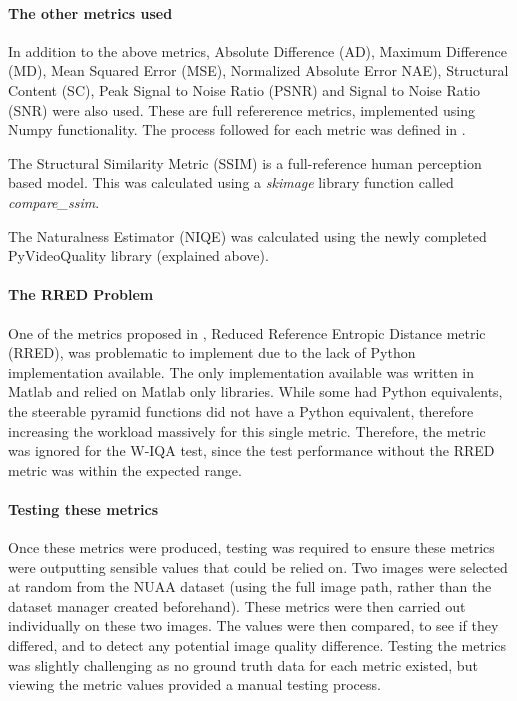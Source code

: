\documentclass[12pt,a4paper]{article}
\begin{document}
            \paragraph{The other metrics used}
                In addition to the above metrics, Absolute Difference (AD), Maximum Difference (MD), Mean Squared Error (MSE), Normalized Absolute Error NAE), Structural Content (SC),
                Peak Signal to Noise Ratio (PSNR) and Signal to Noise Ratio (SNR) were also used. These are full refererence metrics, implemented using
                Numpy functionality. The process followed for each metric was defined in \cite{ImageQualityAssessmentTest}.

                The Structural Similarity Metric (SSIM) is a full-reference human perception based model. This was calculated using a \emph{skimage} library function called \emph{compare\_ssim}. 

                The Naturalness Estimator (NIQE) was calculated using the newly completed PyVideoQuality library (explained above).

            \paragraph{The RRED Problem}
            One of the metrics proposed in \cite{ImageQualityAssessmentTest}, Reduced Reference Entropic Distance metric (RRED), was problematic to implement due to the lack of Python implementation available.
            The only implementation available was written in Matlab and relied on Matlab only libraries. While some had Python equivalents, the steerable pyramid functions did not have a Python equivalent, therefore increasing the workload massively for this single metric. Therefore, the metric was ignored for the W-IQA
            test, since the test performance without the RRED metric was within the expected range. 
            
            \paragraph{Testing these metrics}
            Once these metrics were produced, testing was required to ensure these metrics were outputting sensible values that could be relied on.
            Two images were selected at random from the NUAA dataset (using the full image path, rather than the dataset manager created beforehand). These metrics were then carried out individually on these two images. The values were then compared, to see if they differed, and to detect any potential image quality difference. 
            Testing the metrics was slightly challenging as no ground truth data for each metric existed, but viewing the metric values provided a manual testing process.
\end{document}

